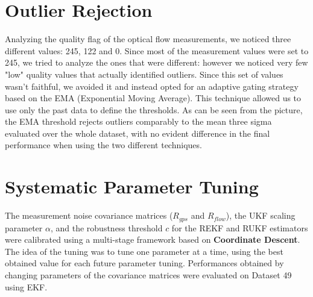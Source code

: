 \documentclass{article}
\begin{document}
\section*{Outlier Rejection}

Analyzing the quality flag of the optical flow measurements, we noticed three different values: 245, 122 and 0.
Since most of the measurement values were set to 245, we tried to analyze the ones that were different: however we noticed very few "low" quality values that actually identified outliers. Since this set of values wasn't faithful, we avoided it and instead opted for an adaptive gating strategy based on the EMA (Exponential Moving Average).
This technique allowed us to use only the past data to define the thresholds. As can be seen from the picture, the EMA threshold rejects outliers comparably to the mean three sigma evaluated over the whole dataset, with no evident difference in the final performance when using the two different techniques.

\section*{Systematic Parameter Tuning}

The measurement noise covariance matrices ($R_{gps}$ and $R_{flow}$), the UKF scaling parameter $\alpha$, and the robustness threshold $c$ for the REKF and RUKF estimators were calibrated using a multi-stage framework based on \textbf{Coordinate Descent}. The idea of the tuning was to tune one parameter at a time, using the best obtained value for each future parameter tuning.
Performances obtained by changing parameters of the covariance matrices were evaluated on Dataset 49 using EKF.
\end{document}
